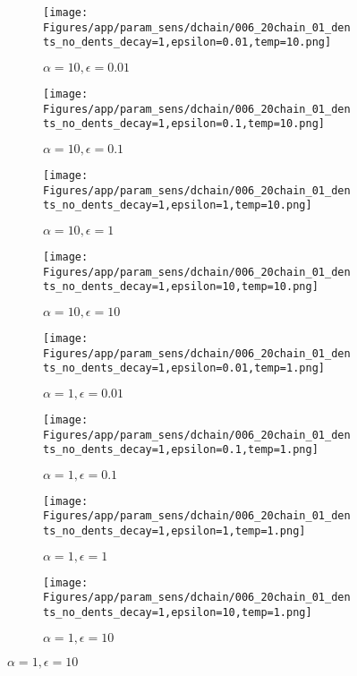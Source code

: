 \documentclass{article}
\theoremstyle{plain}
\begin{document}
\begin{appendices}
\begin{figure}
                \begin{subfigure}[b]{0.24\textwidth}
                    \centering
                    \texttt{[image: Figures/app/param\_sens/dchain/006\_20chain\_01\_dents\_no\_dents\_decay=1,epsilon=0.01,temp=10.png]}
                    \caption*{$\alpha=10,\epsilon=0.01$}
                \end{subfigure}
                \begin{subfigure}[b]{0.24\textwidth}
                    \centering
                    \texttt{[image: Figures/app/param\_sens/dchain/006\_20chain\_01\_dents\_no\_dents\_decay=1,epsilon=0.1,temp=10.png]}
                    \caption*{$\alpha=10,\epsilon=0.1$}
                \end{subfigure}
                \begin{subfigure}[b]{0.24\textwidth}
                    \centering
                    \texttt{[image: Figures/app/param\_sens/dchain/006\_20chain\_01\_dents\_no\_dents\_decay=1,epsilon=1,temp=10.png]}
                    \caption*{$\alpha=10,\epsilon=1$}
                \end{subfigure}
                \begin{subfigure}[b]{0.24\textwidth}
                    \centering
                    \texttt{[image: Figures/app/param\_sens/dchain/006\_20chain\_01\_dents\_no\_dents\_decay=1,epsilon=10,temp=10.png]}
                    \caption*{$\alpha=10,\epsilon=10$}
                \end{subfigure}
                
                \begin{subfigure}[b]{0.24\textwidth}
                    \centering
                    \texttt{[image: Figures/app/param\_sens/dchain/006\_20chain\_01\_dents\_no\_dents\_decay=1,epsilon=0.01,temp=1.png]}
                    \caption*{$\alpha=1,\epsilon=0.01$}
                \end{subfigure}
                \begin{subfigure}[b]{0.24\textwidth}
                    \centering
                    \texttt{[image: Figures/app/param\_sens/dchain/006\_20chain\_01\_dents\_no\_dents\_decay=1,epsilon=0.1,temp=1.png]}
                    \caption*{$\alpha=1,\epsilon=0.1$}
                \end{subfigure}
                \begin{subfigure}[b]{0.24\textwidth}
                    \centering
                    \texttt{[image: Figures/app/param\_sens/dchain/006\_20chain\_01\_dents\_no\_dents\_decay=1,epsilon=1,temp=1.png]}
                    \caption*{$\alpha=1,\epsilon=1$}
                \end{subfigure}
                \begin{subfigure}[b]{0.24\textwidth}
                    \centering
                    \texttt{[image: Figures/app/param\_sens/dchain/006\_20chain\_01\_dents\_no\_dents\_decay=1,epsilon=10,temp=1.png]}
                    \caption*{$\alpha=1,\epsilon=10$}
                \end{subfigure}
                

\end{figure}
\end{appendices}
\end{document}
